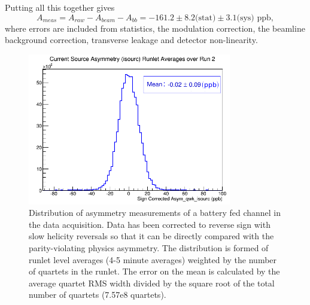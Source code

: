 Putting all this together gives 
\[
A_{meas}=A_{raw}-A_{beam}-A_{bb}=-161.2\pm 8.2\text{(stat)}\pm3.1\text{(sys)~ppb},
\]
where errors are included from statistics, the modulation correction, the beamline background correction, transverse leakage and detector non-linearity.
\begin{figure}[ht]
\begin{center}
\includegraphics[width=3.5in]{./Pictures/isourc_asym.png}
\caption{\label{fig:isourc_asym}Distribution of asymmetry measurements of a battery fed channel in the \Qs data acquisition. Data has been corrected to reverse sign with slow helicity reversals so that it can be directly compared with the parity-violating physics asymmetry. The distribution is formed of runlet level averages (4-5 minute averages) weighted by the number of quartets in the runlet. The error on the mean is calculated by the average quartet RMS width divided by the square root of the total number of quartets (7.57e8 quartets)\protect\footnotemark.}
\end{center}
\end{figure}

